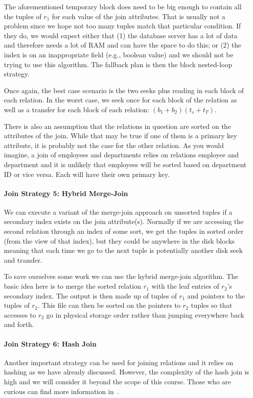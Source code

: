 \documentclass[a4paper]{report}
\begin{document}
The aforementioned temporary block does need to be big enough to contain all the tuples of $r_{1}$ for each value of the join attributes. That is usually not a problem since we hope not too many tuples match that particular condition. If they do, we would expect either that (1) the database server has a lot of data and therefore needs a lot of RAM and can have the space to do this; or (2) the index is on an inappropriate field (e.g., boolean value) and we should not be trying to use this algorithm. The fallback plan is then the block nested-loop strategy.

Once again, the best case scenario is the two seeks plus reading in each block of each relation. In the worst case, we seek once for each block of the relation as well as a transfer for each block of each relation: $(b_{1} + b_{2})(t_{s} + t_{T})$.

There is also an assumption that the relations in question are sorted on the attributes of the join. While that may be true if one of them is a primary key attribute, it is probably not the case for the other relation. As you would imagine, a join of employees and departments relies on relations employee and department and it is unlikely that employees will be sorted based on department ID or vice versa. Each will have their own primary key. 

\paragraph{Join Strategy 5: Hybrid Merge-Join}

We can execute a variant of the merge-join approach on unsorted tuples if a secondary index exists on the join attribute(s). Normally if we are accessing the second relation through an index of some sort, we get the tuples in sorted order (from the view of that index), but they could be anywhere in the disk blocks meaning that each time we go to the next tuple is potentially another disk seek and transfer.

To save ourselves some work we can use the hybrid merge-join algorithm. The basic idea here is to merge the sorted relation $r_{1}$ with the leaf entries of $r_{2}$'s secondary index. The output is then made up of tuples of $r_{1}$ and pointers to the tuples of $r_{2}$. This file can then be sorted on the pointers to $r_{2}$ tuples so that accesses to $r_{2}$ go in physical storage order rather than jumping everywhere back and forth.

\paragraph{Join Strategy 6: Hash Join}
Another important strategy can be used for joining relations and it relies on hashing as we have already discussed. However, the complexity of the hash join is high and we will consider it beyond the scope of this course. Those who are curious can find more information in~\cite{dsc}.
\end{document}
